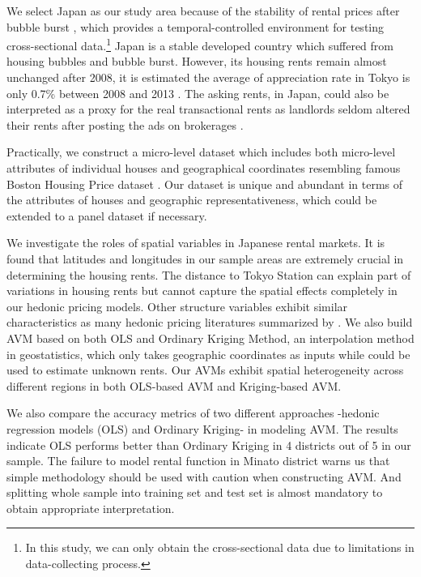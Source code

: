 \documentclass[a4paper, 12pt]{article} %
\begin{document}
We select Japan as our study area because of the stability of rental prices after bubble burst \citep{shimizu}, which provides a temporal-controlled environment for testing cross-sectional data.\footnote{In this study, we can only obtain the cross-sectional data due to limitations in data-collecting process.} Japan is a stable developed country which suffered from housing bubbles and bubble burst. However, its housing rents remain almost unchanged after 2008, it is estimated the average of appreciation rate in Tokyo is only 0.7\% between 2008 and 2013 \citep{Statics}. The asking rents, in Japan, could also be interpreted as a proxy for the real transactional rents as landlords seldom altered their rents after posting the ads on brokerages \citep{seya2011empirical}. 

Practically, we construct a micro-level dataset which includes both micro-level attributes of individual houses and geographical coordinates resembling famous Boston Housing Price dataset \citep{harrison1978hedonic}. Our dataset is unique and abundant in terms of the attributes of houses and geographic representativeness, which could be extended to a panel dataset if necessary. 

We investigate the roles of spatial variables in Japanese rental markets. It is found that latitudes and longitudes in our sample areas are extremely crucial in determining the housing rents. The distance to Tokyo Station can explain part of variations in housing rents but cannot capture the spatial effects completely in our hedonic pricing models. Other structure variables exhibit similar characteristics as many hedonic pricing literatures summarized by \citet{sirmans2005composition}. We also build AVM based on both OLS and Ordinary Kriging Method, an interpolation method in geostatistics, which only takes geographic coordinates as inputs while could be used to estimate unknown rents. Our AVMs exhibit spatial heterogeneity across different regions in both OLS-based AVM and Kriging-based AVM.

We also compare the accuracy metrics of two different approaches -hedonic regression models (OLS) and Ordinary Kriging- in modeling AVM. The results indicate OLS performs better than Ordinary Kriging in 4 districts out of 5 in our sample. The failure to model rental function in Minato district warns us that simple methodology should be used with caution when constructing AVM. And splitting whole sample into training set and test set is almost mandatory to obtain appropriate interpretation.
\end{document}
